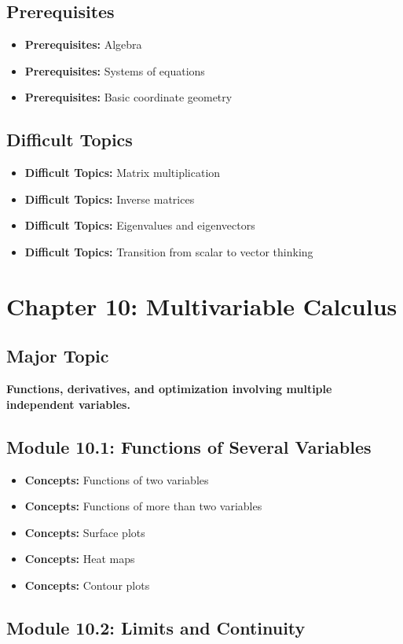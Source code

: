 \documentclass[11pt]{article}
\newcommand{\concept}[1]{\item \textbf{Concepts:} #1}
\newcommand{\difficult}[1]{\item \textbf{Difficult Topics:} #1}
\newcommand{\prereq}[1]{\item \textbf{Prerequisites:} #1}
\begin{document}
\subsection{Prerequisites}

\begin{itemize}
    \prereq{Algebra}
    \prereq{Systems of equations}
    \prereq{Basic coordinate geometry}
\end{itemize}

\subsection{Difficult Topics}

\begin{itemize}
    \difficult{Matrix multiplication}
    \difficult{Inverse matrices}
    \difficult{Eigenvalues and eigenvectors}
    \difficult{Transition from scalar to vector thinking}
\end{itemize}


\section{Chapter 10: Multivariable Calculus}

\subsection{Major Topic}

\textbf{Functions, derivatives, and optimization involving multiple
independent variables.}

\subsection{Module 10.1: Functions of Several Variables}

\begin{itemize}
    \concept{Functions of two variables}
    \concept{Functions of more than two variables}
    \concept{Surface plots}
    \concept{Heat maps}
    \concept{Contour plots}
\end{itemize}

\subsection{Module 10.2: Limits and Continuity}
\end{document}
